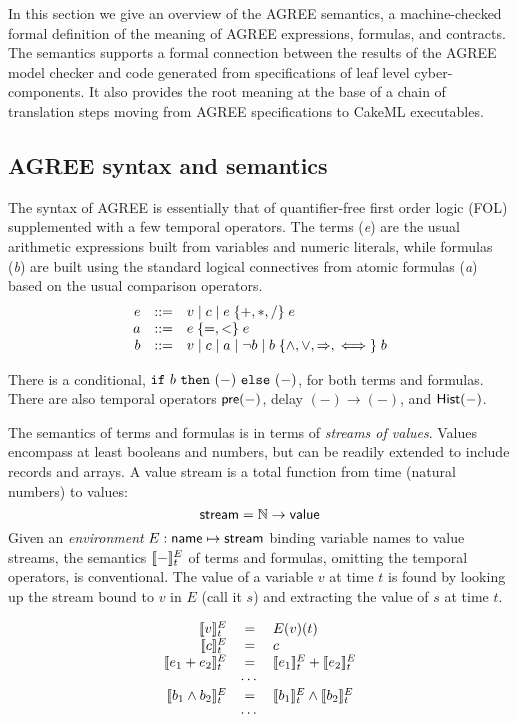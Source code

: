 In this section we give an overview of the AGREE semantics, a
machine-checked formal definition of the meaning of AGREE expressions,
formulas, and contracts. The semantics supports a formal connection
between the results of the AGREE model checker and code generated from
specifications of leaf level cyber-components. It also provides the root
meaning at the base of a chain of translation steps moving from AGREE
specifications to CakeML executables.


\subsection{AGREE syntax and semantics}
\label{agree-semantics}

The syntax of AGREE is essentially that of quantifier-free first order
logic (FOL) supplemented with a few temporal operators. The terms
(\emph{e}) are the usual arithmetic expressions built from variables
and numeric literals, while formulas (\emph{b}) are built using the
standard logical connectives from atomic formulas (\emph{a}) based on
the usual comparison operators.
\[
\begin{array}{rcl}
e & ::= & v \mid c \mid e \;\{ {+,*,/} \}\; e \\
a & ::= & e\; \{ {=,<} \}\; e \\
b & ::= & v \mid c \mid a \mid \neg b
            \mid b \; \{ {\land,\lor,\Rightarrow,\iff} \}\; b
\end{array}
\]

There is a conditional, $\mbox{$\mathtt{if}\ {b}\ \mathtt{then}\ {(-)}\ \mathtt{else}\ {(-)}$}$, for both terms and
formulas. There are also temporal operators $\mathsf{pre}(-)$, delay
$(-) \to (-)$, and $\mathsf{Hist}(-)$.

The semantics of terms and formulas is in terms of \emph{streams of
values}. Values encompass at least booleans and numbers, but can be
readily extended to include records and arrays. A value stream is a
total function from time (natural numbers) to values:
\[
 \mathsf{stream} = \mathbb{N} \to \mathsf{value}
\]
Given an \emph{environment} $E : \mathsf{name} \mapsto \mathsf{stream}$
binding variable names to value streams, the semantics $[\![ - ]\!]^E_t$
of terms and formulas, omitting the temporal operators, is
conventional. The value of a variable $v$ at time $t$ is found by
looking up the stream bound to $v$ in $E$ (call it $s$) and extracting
the value of $s$ at time $t$.

\[
\begin{array}{rcl}
\sem{v}^E_t & = & E(v)(t) \\
\sem{c}^E_t & = & c \\
\sem{e_1 + e_2}^E_t & = & \sem{e_1}^E_t + \sem{e_2}^E_t \\
   & \cdots & \\
\sem{b_1 \land b_2}^E_t & = & \sem{b_1}^E_t \land \sem{b_2}^E_t \\
   & \cdots & \\
\end{array}
\]

